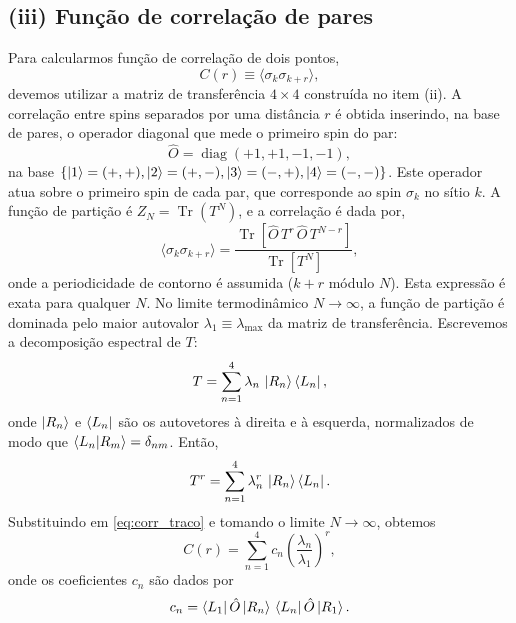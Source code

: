 \documentclass[11pt,a4paper]{article}
\begin{document}
\subsection*{(iii) Função de correlação de pares}
%
Para calcularmos função de correlação de dois pontos,
%
\begin{equation}
    C(r) \equiv \langle \sigma_k \sigma_{k+r} \rangle,
\end{equation}
%
devemos utilizar a matriz de transferência \(4 \times 4\) construída no item (ii). A correlação entre spins separados por uma distância \(r\) é obtida inserindo, na base de pares, o operador diagonal que mede o primeiro spin do par:
%
\begin{equation}
    \hat O = \operatorname{diag}(+1, +1, -1, -1),
\end{equation}
%
na base \(\{\ket{1}=(+,+), \ket{2}=(+,-), \ket{3}=(-,+), \ket{4}=(-,-)\}\). Este operador atua sobre o primeiro spin de cada par, que corresponde ao spin \(\sigma_k\) no sítio \(k\). A função de partição é \(Z_N = \operatorname{Tr}(T^N)\), e a correlação é dada por,
%
\begin{equation}
    \langle \sigma_k \sigma_{k+r} \rangle
    = \frac{\operatorname{Tr}\left[ \hat O \, T^r \, \hat O \, T^{N-r} \right]}{\operatorname{Tr}\left[ T^N \right]},
    \label{eq:corr_traco}
\end{equation}
%
onde a periodicidade de contorno é assumida (\(k+r\) módulo \(N\)). Esta expressão é exata para qualquer \(N\). No limite termodinâmico \(N \to \infty\), a função de partição é dominada pelo maior autovalor \(\lambda_1 \equiv \lambda_{\max}\) da matriz de transferência. Escrevemos a decomposição espectral de \(T\):
%
\begin{equation}
    T = \sum_{n=1}^4 \lambda_n \, \ket{R_n}\bra{L_n},
\end{equation}
%
onde \(\ket{R_n}\) e \(\bra{L_n}\) são os autovetores à direita e à esquerda, normalizados de modo que \(\bra{L_n} \ket{R_m} = \delta_{nm}\). Então,
%
\begin{equation}
    T^r = \sum_{n=1}^4 \lambda_n^r \, \ket{R_n}\bra{L_n}.
\end{equation}
%
Substituindo em \eqref{eq:corr_traco} e tomando o limite \(N \to \infty\), obtemos
%
\begin{equation}
    C(r) = \sum_{n=1}^4 c_n \left( \frac{\lambda_n}{\lambda_1} \right)^r,
    \label{eq:corr_soma}
\end{equation}
%
onde os coeficientes \(c_n\) são dados por
%
\begin{equation}
    c_n = \bra{L_1} \hat O \ket{R_n} \, \bra{L_n} \hat O \ket{R_1}.
    \label{eq:coeficientes}
\end{equation}
\end{document}
